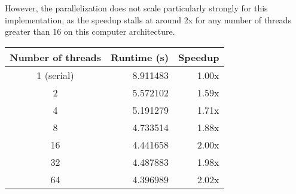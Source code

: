 \begin{questions}
\begin{solution}
    However, the parallelization does not scale particularly strongly for
    this implementation, as the speedup stalls at around 2x for any number
    of threads greater than 16 on this computer architecture.
    
    \begin{center}
    \begin{tabular}{|c|r|r|}
    \hline
    Number of threads & Runtime (s) & Speedup \\
    \hline\hline
    1 (serial) & 8.911483 & 1.00x \\ 
    \hline
    2 & 5.572102 & 1.59x \\ 
    \hline
    4 & 5.191279 & 1.71x \\ 
    \hline
    8 & 4.733514 & 1.88x \\ 
    \hline
    16 & 4.441658 & 2.00x \\ 
    \hline
    32 & 4.487883 & 1.98x \\ 
    \hline
    64 & 4.396989 & 2.02x \\ 
    \hline
    \end{tabular}
    \label{tab:parallelscan}
    \end{center}
    
    
\end{solution}

\end{questions}